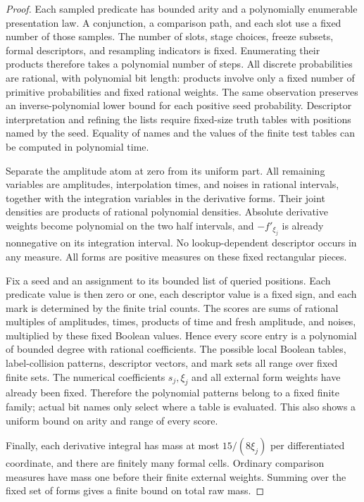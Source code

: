 \begin{proof}
Each sampled predicate has bounded arity and a polynomially enumerable
presentation law. A conjunction, a comparison path, and each slot use
a fixed number of those samples. The number of slots, stage choices,
freeze subsets, formal descriptors, and resampling indicators is fixed.
Enumerating their products therefore takes a polynomial number of
steps. All discrete probabilities are rational, with polynomial bit
length: products involve only a fixed number of primitive probabilities
and fixed rational weights. The same observation preserves an
inverse-polynomial lower bound for each positive seed probability.
Descriptor interpretation and refining the
lists require fixed-size truth tables with positions named by the seed.
Equality of names and the values of the finite test tables can be
computed in polynomial time.

Separate the amplitude atom at zero from its uniform part. All remaining
variables are amplitudes, interpolation times, and noises in rational
intervals, together with the integration variables in the derivative
forms. Their joint densities are products of rational polynomial
densities. Absolute derivative weights become polynomial on the two
half intervals, and $-f'_{\xi_j}$ is already nonnegative on its
integration interval. No lookup-dependent descriptor occurs in any
measure. All forms are positive measures on these fixed rectangular
pieces.

Fix a seed and an assignment to its bounded list of queried positions.
Each predicate value is then zero or one, each descriptor value is a
fixed sign, and each mark is determined by the finite trial counts.
The scores are sums of rational multiples of amplitudes, times, products
of time and fresh amplitude, and noises, multiplied by these fixed
Boolean values. Hence every score entry is a polynomial of bounded
degree with rational coefficients. The possible local Boolean tables,
label-collision patterns, descriptor vectors, and mark sets all range
over fixed finite sets. The numerical coefficients $s_j,\xi_j$ and
all external form weights have already been fixed. Therefore the
polynomial patterns belong to a fixed finite family; actual bit names
only select where a table is evaluated. This also shows a uniform bound
on arity and range of every score.

Finally, each derivative integral has mass at most
$15/(8\xi_j)$ per differentiated coordinate, and there are finitely
many formal cells. Ordinary comparison measures have mass one before
their finite external weights. Summing over the fixed set of forms
gives a finite bound on total raw mass.


\end{proof}
